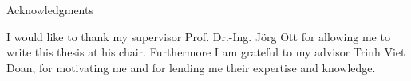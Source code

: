\thispagestyle{empty}

\vspace*{20mm}

\begin{center}
{ Acknowledgments}
\end{center}

\vspace{10mm}

I would like to thank my supervisor Prof. Dr.-Ing. Jörg Ott for allowing me to write this thesis at his chair. Furthermore I am grateful to my advisor Trinh Viet Doan, for motivating me and for lending me their expertise and knowledge.

\vspace{10mm}

\cleardoublepage{}
